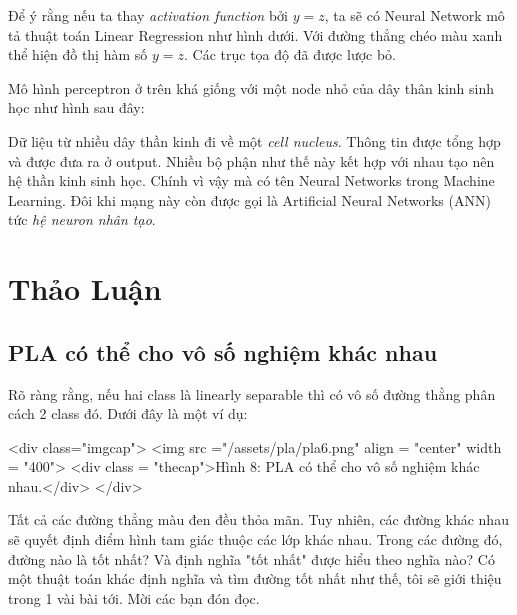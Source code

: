 Để ý rằng nếu ta thay \textit{activation function} bởi $y = z$, ta sẽ có Neural Network mô tả thuật toán Linear Regression như hình dưới. Với đường thẳng chéo màu xanh thể hiện đồ thị hàm số $y = z$. Các trục tọa độ đã được lược bỏ. 
 
 
 
 
 
 
 
Mô hình perceptron ở trên khá giống với một node nhỏ của dây thân kinh sinh học như hình sau đây: 
 
 
 
Dữ liệu từ nhiều dây thần kinh đi về một \textit{cell nucleus}. Thông tin được tổng hợp và được đưa ra ở output. Nhiều bộ phận như thế này kết hợp với nhau tạo nên hệ thần kinh sinh học. Chính vì vậy mà có tên Neural Networks trong Machine Learning. Đôi khi mạng này còn được gọi là Artificial Neural Networks (ANN) tức \textit{hệ neuron nhân tạo}.  
 
 
\section{Thảo Luận}
 
\subsection{PLA có thể cho vô số nghiệm khác nhau }
Rõ ràng rằng, nếu hai class là linearly separable thì có vô số đường thằng phân cách 2 class đó. Dưới đây là một ví dụ: 
 
<div class="imgcap"> 
<img src ="/assets/pla/pla6.png" align = "center" width = "400"> 
<div class = "thecap">Hình 8: PLA có thể cho vô số nghiệm khác nhau.</div> 
</div>  
 
Tất cả các đường thẳng màu đen đều thỏa mãn. Tuy nhiên, các đường khác nhau sẽ quyết định điểm hình tam giác thuộc các lớp khác nhau. Trong các đường đó, đường nào là tốt nhất? Và định nghĩa "tốt nhất" được hiểu theo nghĩa nào? Có một thuật toán khác định nghĩa và tìm đường tốt nhất như thế, tôi sẽ giới thiệu trong 1 vài bài tới. Mời các bạn đón đọc.  
 
